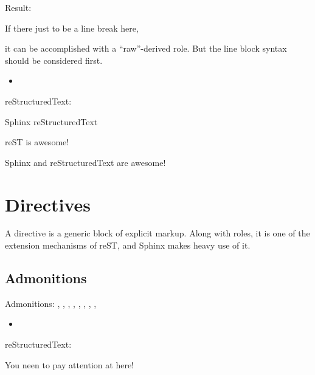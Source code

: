 \documentclass[letterpaper,11pt,english]{sphinxmanual}
\begin{document}
Result:

If there just  to be a line break here,

it can be accomplished with a “raw”-derived role.
But the line block syntax should be considered first.
\begin{itemize}
\item {} 

\end{itemize}

reStructuredText:

\begin{sphinxVerbatim}[commandchars=\\\{\}]
   Sphinx
   reStructuredText

\textbar{}reST\textbar{} is awesome!
\end{sphinxVerbatim}

Sphinx and reStructuredText are awesome!


\section{Directives}
\label{\detokenize{rtxt:directives}}
A directive is a generic block of explicit markup. Along with roles, it is one of the extension mechanisms of reST, and Sphinx makes heavy use of it.


\subsection{Admonitions}
\label{\detokenize{rtxt:admonitions}}
Admonitions: , , , , , , , , 
\begin{itemize}
\item {} 

\end{itemize}

reStructuredText:

\begin{sphinxVerbatim}[commandchars=\\\{\}]
 

   You neen to pay attention at here!
\end{sphinxVerbatim}
\end{document}
